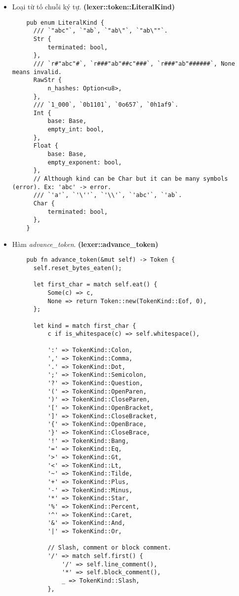 {\begin{itemize}
\begin{lstlisting}[]
      /// End of input.
      Eof,
    }
  \end{lstlisting}
  \item \label{ap1:simple_token_literal}Loại từ tố chuỗi ký tự. \textbf{(lexer::token::LiteralKind)}
  \begin{lstlisting}
    pub enum LiteralKind {
      /// `"abc"`, `"ab`, `"ab\"`, `"ab\""`.
      Str {
          terminated: bool,
      },
      /// `r#"abc"#`, `r###"ab"##c"###`, `r###"ab"######`, None means invalid.
      RawStr {
          n_hashes: Option<u8>,
      },
      /// `1_000`, `0b1101`, `0o657`, `0h1af9`.
      Int {
          base: Base,
          empty_int: bool,
      },
      Float {
          base: Base,
          empty_exponent: bool,
      },
      // Although kind can be Char but it can be many symbols (error). Ex: 'abc' -> error.
      /// `'a'`, `'\''`, `'\\'`, `'abc'`, `'ab`.
      Char {
          terminated: bool,
      },
    }
  \end{lstlisting}
  \item \label{ap1:simple_token_advance_token}Hàm \textit{advance\_token}. \textbf{(lexer::advance\_token)}
  \begin{lstlisting}
    pub fn advance_token(&mut self) -> Token {
      self.reset_bytes_eaten();

      let first_char = match self.eat() {
          Some(c) => c,
          None => return Token::new(TokenKind::Eof, 0),
      };

      let kind = match first_char {
          c if is_whitespace(c) => self.whitespace(),

          ':' => TokenKind::Colon,
          ',' => TokenKind::Comma,
          '.' => TokenKind::Dot,
          ';' => TokenKind::Semicolon,
          '?' => TokenKind::Question,
          '(' => TokenKind::OpenParen,
          ')' => TokenKind::CloseParen,
          '[' => TokenKind::OpenBracket,
          ']' => TokenKind::CloseBracket,
          '{' => TokenKind::OpenBrace,
          '}' => TokenKind::CloseBrace,
          '!' => TokenKind::Bang,
          '=' => TokenKind::Eq,
          '>' => TokenKind::Gt,
          '<' => TokenKind::Lt,
          '~' => TokenKind::Tilde,
          '+' => TokenKind::Plus,
          '-' => TokenKind::Minus,
          '*' => TokenKind::Star,
          '%' => TokenKind::Percent,
          '^' => TokenKind::Caret,
          '&' => TokenKind::And,
          '|' => TokenKind::Or,

          // Slash, comment or block comment.
          '/' => match self.first() {
              '/' => self.line_comment(),
              '*' => self.block_comment(),
              _ => TokenKind::Slash,
          },


\end{lstlisting}
\end{itemize}}
